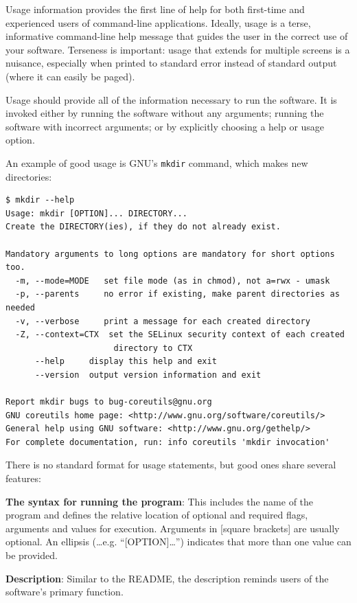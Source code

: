 \documentclass[10pt,letterpaper]{article}
\begin{document}
Usage information provides the first line of help for both first-time and
experienced users of command-line applications.
Ideally, usage is a terse, informative command-line help message that
guides the user in the correct use of your software. Terseness is
important: usage that extends for multiple screens is a nuisance, especially when
printed to standard error instead of standard output (where it can
easily be paged).

Usage should provide all of the information necessary to run the
software. It is invoked either by running the software without
any arguments; running the software with incorrect arguments; or by
explicitly choosing a help or usage option.

An example of good usage is GNU's \texttt{mkdir} command, which makes
new directories:

\begin{small}
\begin{verbatim}
$ mkdir --help
Usage: mkdir [OPTION]... DIRECTORY...
Create the DIRECTORY(ies), if they do not already exist.

Mandatory arguments to long options are mandatory for short options too.
  -m, --mode=MODE   set file mode (as in chmod), not a=rwx - umask
  -p, --parents     no error if existing, make parent directories as needed
  -v, --verbose     print a message for each created directory
  -Z, --context=CTX  set the SELinux security context of each created
                      directory to CTX
      --help     display this help and exit
      --version  output version information and exit

Report mkdir bugs to bug-coreutils@gnu.org
GNU coreutils home page: <http://www.gnu.org/software/coreutils/>
General help using GNU software: <http://www.gnu.org/gethelp/>
For complete documentation, run: info coreutils 'mkdir invocation'
\end{verbatim}
\end{small}

There is no standard format for usage statements, but good ones share
several features:

\textbf{The syntax for running the program}: This includes the name of the
program and defines the relative
location of optional and required flags, arguments and values for execution.
Arguments in {[}square brackets{]}
are usually optional. An ellipsis (\ldots e.g. ``{[}OPTION{]}\ldots{}'')
indicates that more than one value can be provided.

\textbf{Description}: Similar to the README, the
description reminds users of the software's primary function.
\end{document}

